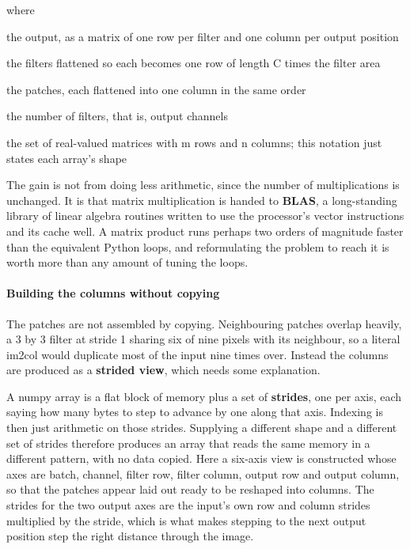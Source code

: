 \noindent where
\begin{description}[leftmargin=2.4em,style=nextline,font=\normalfont\ttfamily]\setlength\itemsep{1pt}
  \item[{$Y$}] \normalfont the output, as a matrix of one row per filter and one column per output position
  \item[{$W_{\mathrm{flat}}$}] \normalfont the filters flattened so each becomes one row of length C times the filter area
  \item[{$X_{\mathrm{cols}}$}] \normalfont the patches, each flattened into one column in the same order
  \item[{$O$}] \normalfont the number of filters, that is, output channels
  \item[{$\mathbb{R}^{\,m \times n}$}] \normalfont the set of real-valued matrices with m rows and n columns; this notation just states each array's shape
\end{description}
The gain is not from doing less arithmetic, since the number of multiplications is unchanged. It is that matrix multiplication is handed to \textbf{BLAS}, a long-standing library of linear algebra routines written to use the processor's vector instructions and its cache well. A matrix product runs perhaps two orders of magnitude faster than the equivalent Python loops, and reformulating the problem to reach it is worth more than any amount of tuning the loops.


\paragraph{Building the columns without copying}
The patches are not assembled by copying. Neighbouring patches overlap heavily, a 3 by 3 filter at stride 1 sharing six of nine pixels with its neighbour, so a literal im2col would duplicate most of the input nine times over. Instead the columns are produced as a \textbf{strided view}, which needs some explanation.

A numpy array is a flat block of memory plus a set of \textbf{strides}, one per axis, each saying how many bytes to step to advance by one along that axis. Indexing is then just arithmetic on those strides. Supplying a different shape and a different set of strides therefore produces an array that reads the same memory in a different pattern, with no data copied. Here a six-axis view is constructed whose axes are batch, channel, filter row, filter column, output row and output column, so that the patches appear laid out ready to be reshaped into columns. The strides for the two output axes are the input's own row and column strides multiplied by the stride, which is what makes stepping to the next output position step the right distance through the image.


